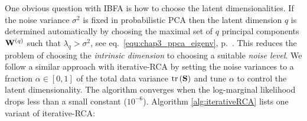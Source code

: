       One obvious question with IBFA is how to choose the latent dimensionalities.
      If the noise variance $\sigma^2$ is fixed in probabilistic PCA then the latent dimension $q$ is determined automatically by choosing the maximal set of $q$ principal components $\mathbf{W}^{(q)}$ such that $\lambda_q > \sigma^2$, see eq.~\eqref{equ:chap3_ppca_eigenv}, p.~\pageref{equ:chap3_ppca_eigenv}.
      This reduces the problem of choosing the \textit{intrinsic dimension} to choosing a suitable \textit{noise level}.
      We follow a similar approach with iterative-RCA by setting the noise variances to a fraction $\alpha \in [0,1]$ of the total data variance $\textrm{tr} \left( \mathbf{S} \right)$ and tune $\alpha$ to control the latent dimensionality.
      The algorithm converges when the log-marginal likelihood drops less than a small constant ($10^{-6}$). Algorithm \ref{alg:iterativeRCA} lists one variant of iterative-RCA:
    
